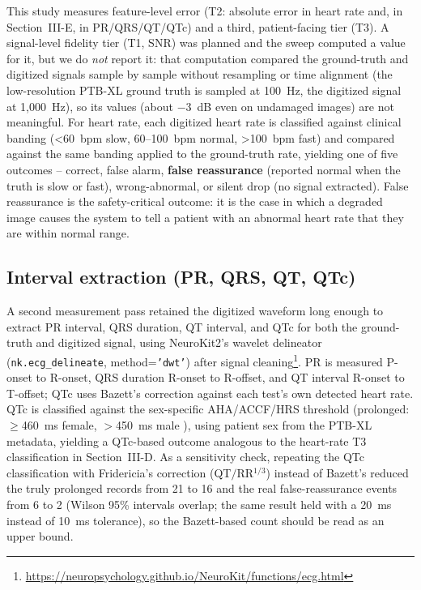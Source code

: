 \documentclass[conference]{IEEEtran}
\begin{document}
This study measures feature-level error (T2: absolute error in heart rate and, in
Section~III-E, in PR/QRS/QT/QTc) and a third, patient-facing tier (T3). A signal-level
fidelity tier (T1, SNR) was planned and the sweep computed a value for it, but we do
\emph{not} report it: that computation compared the ground-truth and digitized signals
sample by sample without resampling or time alignment (the low-resolution PTB-XL
ground truth is sampled at 100~Hz, the digitized signal at 1{,}000~Hz), so its values
(about $-3$~dB even on undamaged images) are not meaningful. For heart rate, each
digitized heart rate is classified against
clinical banding (\textless60~bpm slow, 60--100~bpm normal, \textgreater100~bpm fast)
\cite{ref52} and compared against the same banding applied to the ground-truth rate,
yielding one of five outcomes -- correct, false alarm, \textbf{false reassurance}
(reported normal when the truth is slow or fast), wrong-abnormal, or silent drop (no
signal extracted). False reassurance is the safety-critical outcome: it is the case
in which a degraded image causes the system to tell a patient with an abnormal heart
rate that they are within normal range.

\subsection{Interval extraction (PR, QRS, QT, QTc)}

A second measurement pass retained the digitized waveform long enough to extract PR
interval, QRS duration, QT interval, and QTc for both the ground-truth and digitized
signal, using NeuroKit2's wavelet delineator
(\texttt{nk.ecg\_delineate}, method=\texttt{'dwt'}) after signal
cleaning\footnote{\url{https://neuropsychology.github.io/NeuroKit/functions/ecg.html}}.
PR is measured P-onset to R-onset, QRS duration R-onset to R-offset, and QT interval
R-onset to T-offset; QTc uses Bazett's correction against each test's own detected
heart rate. QTc is classified against the sex-specific AHA/ACCF/HRS threshold
(prolonged: $\geq$460~ms female, $>$450~ms male \cite{ref52}), using patient sex from
the PTB-XL metadata, yielding a QTc-based outcome analogous to the heart-rate T3
classification in Section~III-D. As a sensitivity check, repeating the QTc
classification with Fridericia's correction (QT$/$RR$^{1/3}$) instead of Bazett's
reduced the truly prolonged records from 21 to 16 and the real false-reassurance events
from 6 to 2 (Wilson 95\% intervals overlap; the same result held with a 20~ms instead
of 10~ms tolerance), so the Bazett-based count should be read as an upper bound.
\end{document}
